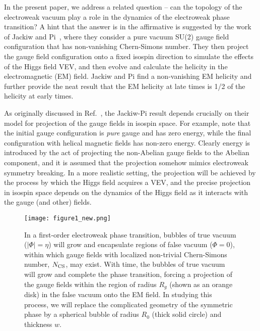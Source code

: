\documentclass[prd,twocolumn,nofootinbib]{revtex4-1}
\begin{document}
In the present paper, we address a related question -- can the topology of the electroweak
vacuum play a role in the dynamics of the electroweak phase transition?
A hint that the answer is in the affirmative is suggested by the work of 
Jackiw and Pi~\cite{jackiw2000creation},
where they consider a pure vacuum SU(2) gauge field configuration that has non-vanishing
Chern-Simons number. 
They then project the gauge field configuration onto a fixed isospin direction 
to simulate the effects of the Higgs field VEV, and then evolve and calculate the helicity in 
the electromagnetic (EM) field. Jackiw and Pi find a non-vanishing EM helicity and
further provide the neat result that the EM helicity at late times is 1/2 of
the helicity at early times.

As originally discussed in Ref.~\cite{jackiw2000creation}, the Jackiw-Pi result depends 
crucially on their model for projection of the gauge fields in isospin space.
For example, note that the initial gauge configuration is {\it pure} gauge and has zero
energy, while the final configuration with helical magnetic fields has non-zero energy. Clearly
energy is introduced by the act of projecting the non-Abelian gauge fields to the Abelian
component, and it is assumed that the projection somehow mimics electroweak symmetry 
breaking. In a more realistic setting, the projection will be achieved by the process by which 
the Higgs field acquires a VEV, and the precise projection in isospin space
depends on the dynamics of the Higgs field as it interacts with the gauge (and other)
fields.



\begin{figure}
  \texttt{[image: figure1\_new.png]}
  \caption{
  In a first-order electroweak phase transition, bubbles of true vacuum
  ($|\Phi| = \eta$) will grow and encapsulate regions of false vacuum 
  ($\Phi=0$), 
 within which gauge fields with localized non-trivial Chern-Simons number, $N_{\rm{CS}}$, 
   may exist. With time,
  the bubbles of true vacuum will grow and complete the phase transition, forcing a
  projection of the gauge fields 
  within the region of radius $R_g$ (shown as an orange disk)
  in the false vacuum onto the EM field. 
  In studying this process,
  we will replace the complicated geometry of the symmetric phase by a spherical
  bubble of radius $R_0$ (thick solid circle) and thickness $w$. 
  }
\label{setup1}
\end{figure}
\end{document}
